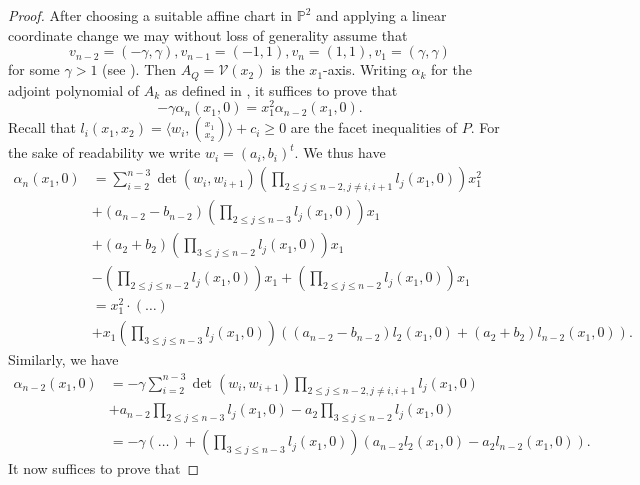 \documentclass[a4paper,10pt]{amsart}
\theoremstyle{definition}
\theoremstyle{plain}
\newcommand{\cV}{{\mathcal V}}
\newcommand{\pp}{\mathbb{P}}
\begin{document}
\begin{proof}
 After choosing a suitable affine chart in $\pp^2$ and applying a linear coordinate change we may without loss of generality assume that
 \begin{equation*}
     v_{n-2} = (-\gamma,\gamma), v_{n-1} = (-1,1), v_n = (1,1), v_1 = (\gamma,\gamma)
 \end{equation*}
 for some $\gamma > 1$ (see ). Then $A_Q = \cV(x_2)$ is the $x_1$-axis. Writing $\alpha_k$ for the adjoint polynomial of $A_k$ as defined in , it suffices to prove that
 \begin{equation*}
     -\gamma\alpha_n(x_1,0) = x_1^2\alpha_{n-2}(x_1,0).
 \end{equation*}
 Recall that $l_i(x_1,x_2) = \langle w_i, \binom{x_1}{x_2} \rangle + c_i \geq 0$ are the facet inequalities of $P$. For the sake of readability we write $w_i = (a_i,b_i)^t$. We thus have 
 \begin{equation*}
 \begin{split}
     \alpha_n(x_1,0) &= \sum_{i=2}^{n-3} \det(w_i,w_{i+1}) \left(\prod_{2\leq j\leq n-2, j\neq i,i+1} l_j(x_1,0)\right) x_1^2 \\
     &+ (a_{n-2}-b_{n-2})\left(\prod_{2\leq j \leq n-3} l_j(x_1,0)\right) x_1\\ & + (a_2+b_2)\left(\prod_{3\leq j \leq n-2} l_j(x_1,0)\right) x_1\\
     &- \left(\prod_{2\leq j \leq n-2} l_j(x_1,0)\right) x_1 + \left(\prod_{2\leq j \leq n-2} l_j(x_1,0)\right) x_1 \\
    &= x_1^2 \cdot(\dots)\\ & + x_1 \left(\prod_{3\leq j\leq n-3} l_j(x_1,0)\right)((a_{n-2}-b_{n-2})l_2(x_1,0) + (a_2+b_2)l_{n-2}(x_1,0)).
 \end{split}
 \end{equation*}
 Similarly, we have
 \begin{equation*}
 \begin{split}
     \alpha_{n-2}(x_1,0) &= -\gamma \sum_{i=2}^{n-3} \det(w_i,w_{i+1}) \prod_{2\leq j\leq n-2, j\neq i,i+1} l_j(x_1,0) \\
     & + a_{n-2} \prod_{2\leq j\leq n-3} l_j(x_1,0) - a_2 \prod_{3\leq j\leq n-2} l_j(x_1,0) \\
     &= -\gamma(\dots) + \left(\prod_{3\leq j\leq n-3} l_j(x_1,0)\right)(a_{n-2}l_2(x_1,0) - a_2l_{n-2}(x_1,0)).
 \end{split}
 \end{equation*}
 It now suffices to prove that

\end{proof}
\end{document}

